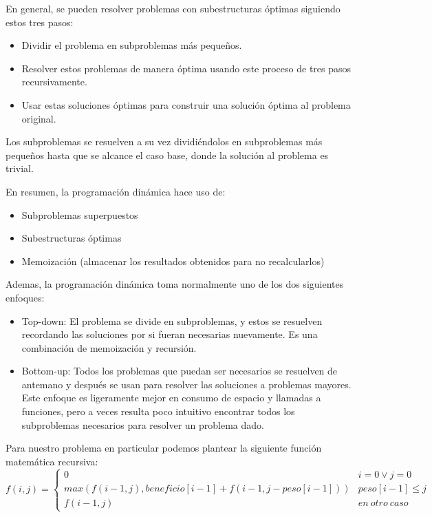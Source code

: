 En general, se pueden resolver problemas con subestructuras óptimas siguiendo estos tres pasos:
\begin{itemize}
	\item Dividir el problema en subproblemas más pequeños.
	\item Resolver estos problemas de manera óptima usando este proceso de tres pasos recursivamente.
	\item Usar estas soluciones óptimas para construir una solución óptima al problema original.
\end{itemize}
Los subproblemas se resuelven a su vez dividiéndolos en subproblemas más pequeños hasta que se alcance el caso base, donde la solución al problema es trivial.


En resumen, la programación dinámica hace uso de:
\begin{itemize}
	\item Subproblemas superpuestos
	\item Subestructuras óptimas
	\item Memoización (almacenar los resultados obtenidos para no recalcularlos)
\end{itemize}


Ademas, la programación dinámica toma normalmente uno de los dos siguientes enfoques:
\begin{itemize}
	\item Top-down: El problema se divide en subproblemas, y estos se resuelven recordando las soluciones por si fueran necesarias nuevamente. Es una combinación de memoización y recursión.
	\item Bottom-up: Todos los problemas que puedan ser necesarios se resuelven de antemano y después se usan para resolver las soluciones a problemas mayores. Este enfoque es ligeramente mejor en consumo de espacio y llamadas a funciones, pero a veces resulta poco intuitivo encontrar todos los subproblemas necesarios para resolver un problema dado.
\end{itemize}

Para nuestro problema en particular podemos plantear la siguiente función matemática recursiva:
\begin{equation*}
f(i,j) = \begin{cases} 
          0 & i = 0 \lor j = 0 \\
          max(f(i-1,j), beneficio[i-1] + f(i-1, j-peso[i-1])) & peso[i-1] \leq j \\
          f(i-1, j) & en\ otro\ caso 
       \end{cases}
\end{equation*}

